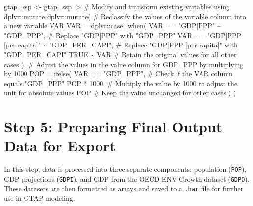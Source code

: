\documentclass[
  letterpaper,
  DIV=11,
  numbers=noendperiod]{scrartcl}
\newenvironment{Shaded}{}{}
\newcommand{\AttributeTok}[1]{\textcolor[rgb]{0.00,0.34,0.68}{#1}}
\newcommand{\CommentTok}[1]{\textcolor[rgb]{0.54,0.53,0.53}{#1}}
\newcommand{\ConstantTok}[1]{\textcolor[rgb]{0.67,0.33,0.00}{#1}}
\newcommand{\DecValTok}[1]{\textcolor[rgb]{0.69,0.50,0.00}{#1}}
\newcommand{\FunctionTok}[1]{\textcolor[rgb]{0.39,0.29,0.61}{#1}}
\newcommand{\NormalTok}[1]{\textcolor[rgb]{0.12,0.11,0.11}{#1}}
\newcommand{\OtherTok}[1]{\textcolor[rgb]{0.00,0.43,0.16}{#1}}
\newcommand{\SpecialCharTok}[1]{\textcolor[rgb]{0.24,0.68,0.91}{#1}}
\newcommand{\StringTok}[1]{\textcolor[rgb]{0.75,0.01,0.01}{#1}}
\begin{document}
\begin{Shaded}
\begin{Highlighting}[]
\NormalTok{gtap\_ssp }\OtherTok{\textless{}{-}}\NormalTok{ gtap\_ssp }\SpecialCharTok{|\textgreater{}}
  \CommentTok{\# Modify and transform existing variables using dplyr::mutate}
\NormalTok{  dplyr}\SpecialCharTok{::}\FunctionTok{mutate}\NormalTok{(}
    \CommentTok{\# Reclassify the values of the \textquotesingle{}variable\textquotesingle{} column into a new variable \textquotesingle{}VAR\textquotesingle{}}
    \AttributeTok{VAR =}\NormalTok{ dplyr}\SpecialCharTok{::}\FunctionTok{case\_when}\NormalTok{(}
\NormalTok{      VAR }\SpecialCharTok{==} \StringTok{"GDP|PPP"} \SpecialCharTok{\textasciitilde{}} \StringTok{"GDP\_PPP"}\NormalTok{,                }\CommentTok{\# Replace "GDP|PPP" with "GDP\_PPP"}
\NormalTok{      VAR }\SpecialCharTok{==} \StringTok{"GDP|PPP [per capita]"} \SpecialCharTok{\textasciitilde{}} \StringTok{"GDP\_PER\_CAPI"}\NormalTok{,  }\CommentTok{\# Replace "GDP|PPP [per capita]" with "GDP\_PER\_CAPI"}
      \ConstantTok{TRUE} \SpecialCharTok{\textasciitilde{}}\NormalTok{ VAR                                    }\CommentTok{\# Retain the original values for all other cases}
\NormalTok{    ),}
    \CommentTok{\# Adjust the values in the \textquotesingle{}value\textquotesingle{} column for GDP\_PPP by multiplying by 1000}
    \AttributeTok{POP =} \FunctionTok{ifelse}\NormalTok{(}
\NormalTok{      VAR }\SpecialCharTok{==} \StringTok{"GDP\_PPP"}\NormalTok{,    }\CommentTok{\# Check if the \textquotesingle{}VAR\textquotesingle{} column equals "GDP\_PPP"}
\NormalTok{      POP }\SpecialCharTok{*} \DecValTok{1000}\NormalTok{,        }\CommentTok{\# Multiply the value by 1000 to adjust the unit for absolute values}
\NormalTok{      POP                }\CommentTok{\# Keep the value unchanged for other cases}
\NormalTok{    )}
\NormalTok{  )}
\end{Highlighting}
\end{Shaded}

\section{Step 5: Preparing Final Output Data for
Export}\label{step-5-preparing-final-output-data-for-export}

In this step, data is processed into three separate components:
population (\texttt{POP}), GDP projections (\texttt{GDPI}), and GDP from
the OECD ENV-Growth dataset (\texttt{GDPO}). These datasets are then
formatted as arrays and saved to a \texttt{.har} file for further use in
GTAP modeling.
\end{document}
